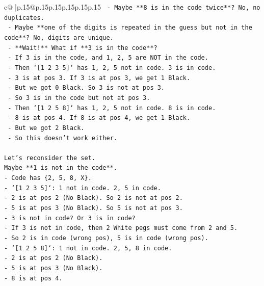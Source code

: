 \documentclass{article}
\begin{document}
{\begin{supertabular}{c@{$\;$}|p{.15\linewidth}@{}p{.15\linewidth}p{.15\linewidth}p{.15\linewidth}p{.15\linewidth}p{.15\linewidth}}
{{{\texttt{        {-} Maybe **8 is in the code twice**? No, no duplicates.} \\
\texttt{        {-} Maybe **one of the digits is repeated in the guess but not in the code**? No, digits are unique.} \\
\texttt{        {-} **Wait!** What if **3 is in the code**?} \\
\texttt{        {-} If 3 is in the code, and 1, 2, 5 are NOT in the code.} \\
\texttt{        {-} Then `{[}1 2 3 5{]}` has 1, 2, 5 not in code. 3 is in code.} \\
\texttt{        {-} 3 is at pos 3. If 3 is at pos 3, we get 1 Black.} \\
\texttt{        {-} But we got 0 Black. So 3 is not at pos 3.} \\
\texttt{        {-} So 3 is in the code but not at pos 3.} \\
\texttt{        {-} Then `{[}1 2 5 8{]}` has 1, 2, 5 not in code. 8 is in code.} \\
\texttt{        {-} 8 is at pos 4. If 8 is at pos 4, we get 1 Black.} \\
\texttt{        {-} But we got 2 Black.} \\
\texttt{        {-} So this doesn't work either.} \\
\\ 
\texttt{Let's reconsider the set.} \\
\texttt{Maybe **1 is not in the code**.} \\
\texttt{{-} Code has \{2, 5, 8, X\}.} \\
\texttt{{-} `{[}1 2 3 5{]}`: 1 not in code. 2, 5 in code.} \\
\texttt{{-} 2 is at pos 2 (No Black). So 2 is not at pos 2.} \\
\texttt{{-} 5 is at pos 3 (No Black). So 5 is not at pos 3.} \\
\texttt{{-} 3 is not in code? Or 3 is in code?} \\
\texttt{{-} If 3 is not in code, then 2 White pegs must come from 2 and 5.} \\
\texttt{{-} So 2 is in code (wrong pos), 5 is in code (wrong pos).} \\
\texttt{{-} `{[}1 2 5 8{]}`: 1 not in code. 2, 5, 8 in code.} \\
\texttt{{-} 2 is at pos 2 (No Black).} \\
\texttt{{-} 5 is at pos 3 (No Black).} \\
\texttt{{-} 8 is at pos 4.} \\
}}}
\end{supertabular}}
\end{document}

